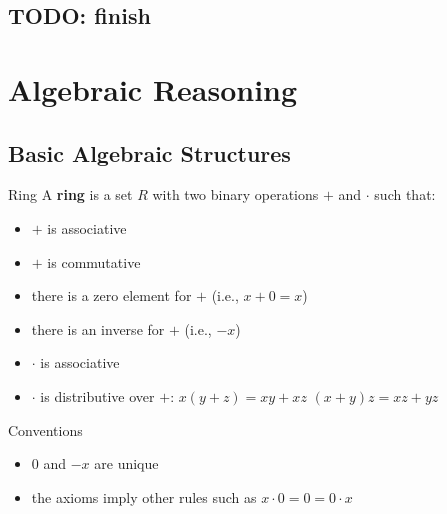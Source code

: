 \documentclass[a4paper, 11pt]{report}
\begin{document}
\section{TODO: finish}

\chapter{Algebraic Reasoning}

\section{Basic Algebraic Structures}

\begin{defframe}{Ring}{}
    A \textbf{ring} is a set $R$ with two binary operations $+$ and $\cdot$ such that:
    \vspace{0.5em}
    
    \noindent
    \begin{minipage}[t]{0.48\textwidth}
        \begin{itemize}
            \item $+$ is associative
            \item $+$ is commutative
            \item there is a zero element for $+$ (i.e., $x + 0 = x$)
            \item there is an inverse for $+$ (i.e., $-x$)
        \end{itemize}
    \end{minipage}%
    \hfill
    \begin{minipage}[t]{0.48\textwidth}
        \begin{itemize}
            \item $\cdot$ is associative
            \item $\cdot$ is distributive over $+$:
                \subitem $x(y + z) = xy + xz$
                \subitem $(x+y)z = xz + yz$
        \end{itemize}
    \end{minipage}

    \begin{gframe}{Conventions}
        \vspace{-0.5em}
        \begin{itemize}
            \item $0$ and $-x$ are unique
            \item the axioms imply other rules such as $x \cdot 0 = 0 = 0 \cdot x$
        \end{itemize}
    \end{gframe}
\end{defframe}
\end{document}
